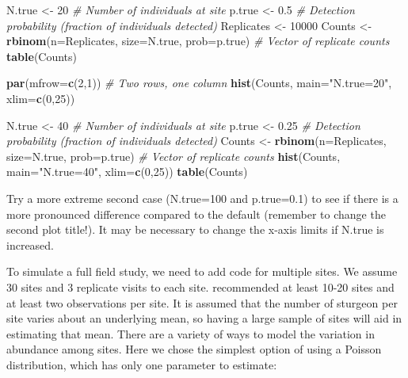 \documentclass[
]{krantz}
\makeatletter
\newenvironment{Shaded}{\begin{snugshade}}{\end{snugshade}}
\newcommand{\AttributeTok}[1]{\textcolor[rgb]{0.27,0.27,0.27}{#1}}
\newcommand{\CommentTok}[1]{\textcolor[rgb]{0.37,0.37,0.37}{\textit{#1}}}
\newcommand{\DecValTok}[1]{\textcolor[rgb]{0.06,0.06,0.06}{#1}}
\newcommand{\FloatTok}[1]{\textcolor[rgb]{0.06,0.06,0.06}{#1}}
\newcommand{\FunctionTok}[1]{\textcolor[rgb]{0.27,0.27,0.27}{\textbf{#1}}}
\newcommand{\NormalTok}[1]{#1}
\newcommand{\OtherTok}[1]{\textcolor[rgb]{0.37,0.37,0.37}{#1}}
\newcommand{\StringTok}[1]{\textcolor[rgb]{0.5,0.5,0.5}{#1}}
\newenvironment{kframe}{%
\medskip{}
\setlength{\fboxsep}{.8em}
 \def\at@end@of@kframe{}%
 \ifinner\ifhmode%
  \def\at@end@of@kframe{\end{minipage}}%
  \begin{minipage}{\columnwidth}%
 \fi\fi%
 \def\FrameCommand##1{\hskip\@totalleftmargin \hskip-\fboxsep
 \colorbox{shadecolor}{##1}\hskip-\fboxsep
     \hskip-\linewidth \hskip-\@totalleftmargin \hskip\columnwidth}%
 \MakeFramed {\advance\hsize-\width
   \@totalleftmargin\z@ \linewidth\hsize
   \@setminipage}}%
 {\par\unskip\endMakeFramed%
 \at@end@of@kframe}
\renewenvironment{Shaded}{\begin{kframe}}{\end{kframe}}
\makeatother
\begin{document}
\begin{Shaded}
\begin{Highlighting}[]
\NormalTok{N.true }\OtherTok{\textless{}{-}} \DecValTok{20}  \CommentTok{\# Number of individuals at site}
\NormalTok{p.true }\OtherTok{\textless{}{-}} \FloatTok{0.5} \CommentTok{\# Detection probability (fraction of individuals detected)}
\NormalTok{Replicates }\OtherTok{\textless{}{-}} \DecValTok{10000}
\NormalTok{Counts }\OtherTok{\textless{}{-}} \FunctionTok{rbinom}\NormalTok{(}\AttributeTok{n=}\NormalTok{Replicates, }\AttributeTok{size=}\NormalTok{N.true, }\AttributeTok{prob=}\NormalTok{p.true) }\CommentTok{\# Vector of replicate counts}
\FunctionTok{table}\NormalTok{(Counts)}

\FunctionTok{par}\NormalTok{(}\AttributeTok{mfrow=}\FunctionTok{c}\NormalTok{(}\DecValTok{2}\NormalTok{,}\DecValTok{1}\NormalTok{)) }\CommentTok{\# Two rows, one column}
\FunctionTok{hist}\NormalTok{(Counts, }\AttributeTok{main=}\StringTok{"N.true=20"}\NormalTok{, }\AttributeTok{xlim=}\FunctionTok{c}\NormalTok{(}\DecValTok{0}\NormalTok{,}\DecValTok{25}\NormalTok{))}

\NormalTok{N.true }\OtherTok{\textless{}{-}} \DecValTok{40}  \CommentTok{\# Number of individuals at site}
\NormalTok{p.true }\OtherTok{\textless{}{-}} \FloatTok{0.25} \CommentTok{\# Detection probability (fraction of individuals detected)}
\NormalTok{Counts }\OtherTok{\textless{}{-}} \FunctionTok{rbinom}\NormalTok{(}\AttributeTok{n=}\NormalTok{Replicates, }\AttributeTok{size=}\NormalTok{N.true, }\AttributeTok{prob=}\NormalTok{p.true) }\CommentTok{\# Vector of replicate counts}
\FunctionTok{hist}\NormalTok{(Counts, }\AttributeTok{main=}\StringTok{"N.true=40"}\NormalTok{, }\AttributeTok{xlim=}\FunctionTok{c}\NormalTok{(}\DecValTok{0}\NormalTok{,}\DecValTok{25}\NormalTok{))}
\FunctionTok{table}\NormalTok{(Counts)}
\end{Highlighting}
\end{Shaded}

Try a more extreme second case (N.true=100 and p.true=0.1) to see if there is a more pronounced difference compared to the default (remember to change the second plot title!). It may be necessary to change the x-axis limits if N.true is increased.

To simulate a full field study, we need to add code for multiple sites. We assume 30 sites and 3 replicate visits to each site. \citet{kéry.schaub_2011} recommended at least 10-20 sites and at least two observations per site. It is assumed that the number of sturgeon per site varies about an underlying mean, so having a large sample of sites will aid in estimating that mean. There are a variety of ways to model the variation in abundance among sites. Here we chose the simplest option of using a Poisson distribution, which has only one parameter to estimate:
\end{document}
